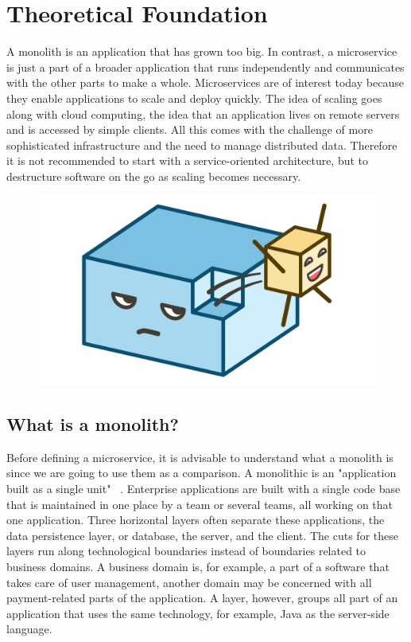 \chapter{Theoretical Foundation}
\label{sec:theory}

A monolith is an application that has grown too big. In contrast, a microservice is just a part of a broader application that runs independently and communicates with the other parts to make a whole. Microservices are of interest today because they enable applications to scale and deploy quickly. The idea of scaling goes along with cloud computing, the idea that an application lives on remote servers and is accessed by simple clients. All this comes with the challenge of more sophisticated infrastructure and the need to manage distributed data. Therefore it is not recommended to start with a service-oriented architecture, but to destructure software on the go as scaling becomes necessary.

\begin{figure}[ht]
  \centering
  \includegraphics[width=0.4\linewidth]{assets/illustration-monolith-microservice.png}
  \label{fig:illustration-monolith-microservice}
\end{figure}


\section{What is a monolith?}

Before defining a microservice, it is advisable to understand what a monolith is since we are going to use them as a comparison. A monolithic is an "application built as a single unit" ~\cite{microservices.2014}. Enterprise applications are built with a single code base that is maintained in one place by a team or several teams, all working on that one application. Three horizontal layers often separate these applications, the data persistence layer, or database, the server, and the client. The cuts for these layers run along technological boundaries instead of boundaries related to business domains. A business domain is, for example, a part of a software that takes care of user management, another domain may be concerned with all payment-related parts of the application. A layer, however, groups all part of an application that uses the same technology, for example, Java as the server-side language.

